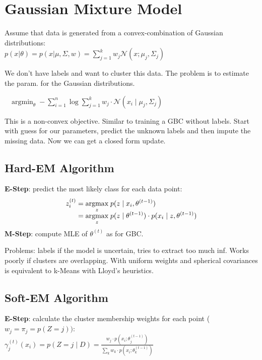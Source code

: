 \section*{Gaussian Mixture Model}

Assume that data is generated from a convex-combination of Gaussian distributions: \\[-8pt]

$p(x  | \theta) = p(x  | \mu, \Sigma, w) = \sum_{j=1}^k w_j \mathcal{N}(x; \mu_j, \Sigma_j)$

We don't have labels and want to cluster this data. The problem is to estimate the param. for the Gaussian distributions.

\ \ $\text{argmin}_{\theta} \; - \sum_{i=1}^n \log \sum_{j=1}^k w_j \cdot \mathcal{N}(x_i \; | \; \mu_j, \Sigma_j)$

This is a non-convex objective. Similar to training a GBC without labels. Start with guess for our parameters, predict the unknown labels and then impute the missing data. Now we can get a closed form update.

\subsection*{Hard-EM Algorithm}

\textbf{E-Step}: predict the most likely class for each data point:
\begin{align*}
	z_i^{(t)} &= \underset{z}{\text{argmax}} \; p(z \; | \; x_i, \theta^{(t-1)}) \\[-5pt]
	&= \underset{z}{\text{argmax}} \; p(z \; | \; \theta^{(t-1)}) \cdot p(x_i \; | \; z, \theta^{(t-1)})
\end{align*}
\textbf{M-Step}: compute MLE of $\theta^{(t)}$ as for GBC. \smallskip

Problems: labels if the model is uncertain, tries to extract too much inf. Works poorly if clusters are overlapping. With uniform weights and spherical covariances is equivalent to k-Means with Lloyd's heuristics.

\subsection*{Soft-EM Algorithm}

\textbf{E-Step}: calculate the cluster membership weights for each point ($w_j = \pi_j = p(Z = j))$: \\[-8pt]

\quad $\gamma_j^{(t)}(x_i) = p(Z = j \; | \; D) =\frac{w_j \cdot p(x_i ; \theta_j^{(t-1)})}{\sum_k w_k \cdot p(x_i ; \theta_k^{(t-1)})}$
		
